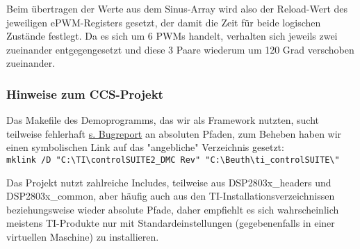 Beim übertragen der Werte aus dem Sinus-Array wird also der Reload-Wert des jeweiligen ePWM-Registers gesetzt, der damit die Zeit für beide logischen Zustände festlegt. Da es sich um 6 PWMs handelt, verhalten sich jeweils zwei zueinander entgegengesetzt und diese 3 Paare wiederum um 120 Grad verschoben zueinander.  
 
 \subsubsection{Hinweise zum CCS-Projekt}
Das Makefile des Demoprogramms, das wir als Framework nutzten, sucht teilweise fehlerhaft \href{http://e2e.ti.com/support/microcontrollers/c2000/f/171/p/326227/1136098}{s. Bugreport} an absoluten Pfaden, zum Beheben haben wir einen symbolischen Link auf das "angebliche" Verzeichnis gesetzt:\\

{\lstinline[breaklines=true]$mklink /D "C:\TI\controlSUITE2_DMC Rev" "C:\Beuth\ti_controlSUITE\"$}\\\par

Das Projekt nutzt zahlreiche Includes, teilweise aus DSP2803x\_headers und DSP2803x\_common, aber häufig auch aus den TI-Installationsverzeichnissen beziehungsweise wieder absolute Pfade, daher empfiehlt es sich wahrscheinlich meistens TI-Produkte nur mit Standardeinstellungen (gegebenenfalls in einer virtuellen Maschine) zu installieren. 
 